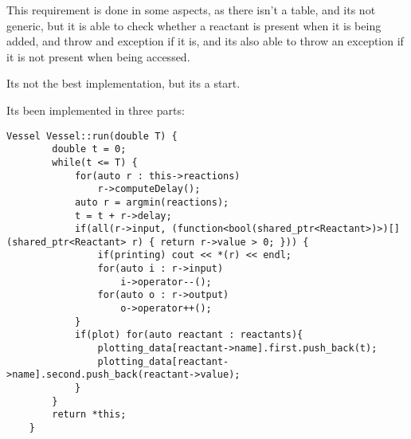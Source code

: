 
This requirement is done in some aspects, as there isn't a table, and its not generic, but it is able to check whether a reactant is present when it is being added, and throw and exception if it is, and its also able to throw an exception if it is not present when being accessed.

Its not the best implementation, but its a start.


Its been implemented in three parts:

\begin{lstlisting}[caption=algorithm implementation, style=colorC++]
    Vessel Vessel::run(double T) {
        double t = 0;
        while(t <= T) {
            for(auto r : this->reactions)
                r->computeDelay();
            auto r = argmin(reactions);
            t = t + r->delay;
            if(all(r->input, (function<bool(shared_ptr<Reactant>)>)[](shared_ptr<Reactant> r) { return r->value > 0; })) {
                if(printing) cout << *(r) << endl;
                for(auto i : r->input)
                    i->operator--();
                for(auto o : r->output)
                    o->operator++();
            }
            if(plot) for(auto reactant : reactants){
                plotting_data[reactant->name].first.push_back(t);
                plotting_data[reactant->name].second.push_back(reactant->value);
            }
        }
        return *this;
    }
\end{lstlisting}

